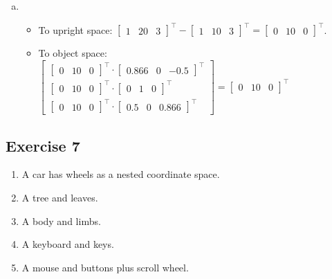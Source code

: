 \documentclass[11pt]{article}
\begin{document}
\begin{enumerate}[a.]
	\item %
	\begin{itemize}
		\item To upright space: $\begin{bmatrix}
				1 & 20 & 3
			\end{bmatrix}^\intercal
			- \begin{bmatrix}
				1 & 10 & 3
			\end{bmatrix}^\intercal
			= \begin{bmatrix}
				0 & 10 & 0
			\end{bmatrix}^\intercal$.
		\item To object space: $\begin{bmatrix}
				\begin{bmatrix}
					0 & 10 & 0
				\end{bmatrix}^\intercal \cdot
				\begin{bmatrix}
					0.866 & 0 & -0.5
				\end{bmatrix}^\intercal \\
				\begin{bmatrix}
					0 & 10 & 0
				\end{bmatrix}^\intercal \cdot
				\begin{bmatrix}
					0 & 1 & 0
				\end{bmatrix}^\intercal \\
				\begin{bmatrix}
					0 & 10 & 0
				\end{bmatrix}^\intercal \cdot
				\begin{bmatrix}
					0.5 & 0 & 0.866
				\end{bmatrix}^\intercal
			\end{bmatrix}=
			\begin{bmatrix}
				0 & 10 & 0
			\end{bmatrix}^\intercal
			$
	\end{itemize}
\end{enumerate}

\subsection{Exercise 7}

\begin{enumerate}[1.)]
	\item A car has wheels as a nested coordinate space.
	\item A tree and leaves.
	\item A body and limbs.
	\item A keyboard and keys.
	\item A mouse and buttons plus scroll wheel.
\end{enumerate}
\end{document}
